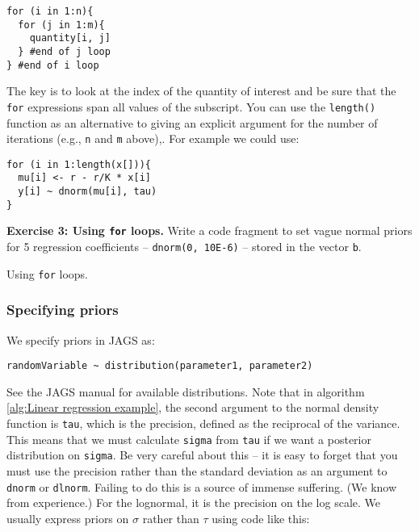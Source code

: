 \documentclass[12pt,english]{article}
\begin{document}
\begin{Verbatim}
for (i in 1:n){
  for (j in 1:m){
    quantity[i, j]
  } #end of j loop
} #end of i loop
\end{Verbatim}

\noindent The key is to look at the index of the quantity of interest and be sure that the \texttt{for} expressions span all values of the subscript.  You can use the \texttt{length() } function as an alternative to giving an explicit argument for the number of iterations (e.g., \texttt{n} and \texttt{m} above),. For example we could use:

\begin{Verbatim}
for (i in 1:length(x[])){
  mu[i] <- r - r/K * x[i]
  y[i] ~ dnorm(mu[i], tau)
}
\end{Verbatim}

\belowcaptionskip=-40pt
\begin{exercise}
\begin{mdframed}
\doublespacing
\textbf{Exercise 3: Using \texttt{for} loops.} Write a code fragment to set vague normal priors for 5 regression coefficients -- \texttt{dnorm(0, 10E-6)} -- stored in the vector \texttt{b}. 
\end{mdframed}
\captionsetup{textformat=empty, labelformat=empty}
\caption[Using \texttt{for} loops]{Using \texttt{for} loops.}
\label{ex:forloops}
\end{exercise}
\belowcaptionskip=0pt

\subsubsection{Specifying priors}

We specify priors in JAGS as:

\begin{Verbatim}
randomVariable ~ distribution(parameter1, parameter2)
\end{Verbatim}

\noindent See the JAGS manual for available distributions. Note that in algorithm \ref{alg:Linear regression example}, the second argument to the normal density function is \texttt{tau}, which is the precision, defined as the reciprocal of the variance. This means that we must calculate \texttt{sigma} from \texttt{tau} if we want a posterior distribution on \texttt{sigma}. Be very careful about this -- it is easy to forget that you must use the precision rather than the standard deviation as an argument to \texttt{dnorm} or \texttt{dlnorm}. Failing to do this is a source of immense suffering. (We know from experience.) For the lognormal, it is the precision on the log scale. We usually express priors on $\sigma$ rather than $\tau$ using code like this:
\end{document}
